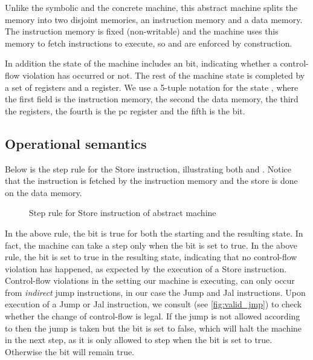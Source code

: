 Unlike the symbolic and the concrete machine, this abstract machine splits the 
memory into two disjoint memories, an instruction memory and a data memory. The
instruction memory is fixed (non-writable) and the machine uses this memory to
fetch instructions to execute, so \NWC and \NXD are enforced by construction.

In addition the state of the machine includes an \ok bit, indicating 
whether a control-flow violation has occurred or not. The rest of the machine
state is completed by a set of registers and a \pc register. We use a 5-tuple
notation for the state \acfistat{\imem}{\dmem}{\reg}{\pc}{\ok}, where the first
field is the instruction memory, the second the data memory, the third the
registers, the fourth is the pc register and the fifth is the \ok bit.

\subsection{Operational semantics}\label{abstract_semantics}
Below is the step rule for the Store instruction, illustrating both \NWC and 
\NXD. Notice that the instruction is fetched by the instruction memory and
the store is done on the data memory.

\begin{figure}[!htpb]
\caption{Step rule for Store instruction of abstract machine}
\end{figure}

In the above rule, the \ok bit is true for both the starting and the
resulting state. In fact, the machine can take a step only when the
\ok bit is set to true. In the above rule, the \ok bit is set to true
in the resulting state, indicating that no control-flow violation has
happened, as expected by the execution of a Store
instruction. Control-flow violations in the \NWC setting our machine
is executing, can only occur from \emph{indirect} jump instructions,
in our case the Jump and Jal instructions. Upon execution of a Jump or
Jal instruction, we consult \J (see \ref{fig:valid_jmp}) to check
whether the change of control-flow is legal. If the jump is not
allowed according to \J then the jump is taken but the \ok bit is set
to false, which will halt the machine in the next step, as it is only
allowed to step when the \ok bit is set to true. Otherwise the \ok bit
will remain true.

